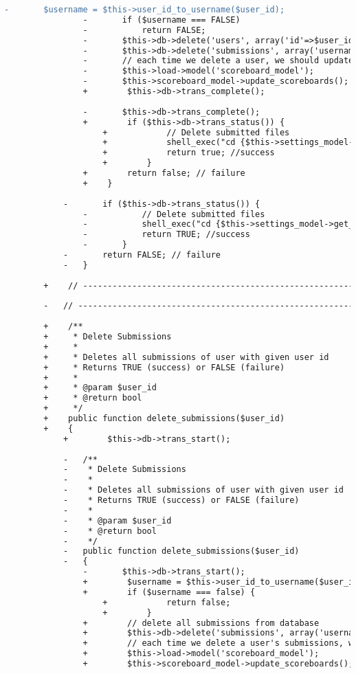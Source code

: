 \begin{lstlisting}[language=diff, caption=Perubahan pada kode User\_model.php]
				-		$username = $this->user_id_to_username($user_id);
				-		if ($username === FALSE)
				-			return FALSE;
				-		$this->db->delete('users', array('id'=>$user_id));
				-		$this->db->delete('submissions', array('username' => $username));
				-		// each time we delete a user, we should update all scoreboards
				-		$this->load->model('scoreboard_model');
				-		$this->scoreboard_model->update_scoreboards();
				+        $this->db->trans_complete();
				
				-		$this->db->trans_complete();
				+        if ($this->db->trans_status()) {
					+            // Delete submitted files
					+            shell_exec("cd {$this->settings_model->get_setting('assignments_root')}; rm -r */*/{$username};");
					+            return true; //success
					+        }
				+        return false; // failure
				+    }
			
			-		if ($this->db->trans_status()) {
				-			// Delete submitted files
				-			shell_exec("cd {$this->settings_model->get_setting('assignments_root')}; rm -r */*/{$username};");
				-			return TRUE; //success
				-		}
			-		return FALSE; // failure
			-	}
		
		+    // ------------------------------------------------------------------------
		
		-	// ------------------------------------------------------------------------
		
		+    /**
		+     * Delete Submissions
		+     *
		+     * Deletes all submissions of user with given user id
		+     * Returns TRUE (success) or FALSE (failure)
		+     *
		+     * @param $user_id
		+     * @return bool
		+     */
		+    public function delete_submissions($user_id)
		+    {
			+        $this->db->trans_start();
			
			-	/**
			-	 * Delete Submissions
			-	 *
			-	 * Deletes all submissions of user with given user id
			-	 * Returns TRUE (success) or FALSE (failure)
			-	 *
			-	 * @param $user_id
			-	 * @return bool
			-	 */
			-	public function delete_submissions($user_id)
			-	{
				-		$this->db->trans_start();
				+        $username = $this->user_id_to_username($user_id);
				+        if ($username === false) {
					+            return false;
					+        }
				+        // delete all submissions from database
				+        $this->db->delete('submissions', array('username' => $username));
				+        // each time we delete a user's submissions, we should update all scoreboards
				+        $this->load->model('scoreboard_model');
				+        $this->scoreboard_model->update_scoreboards();
				

\end{lstlisting}
